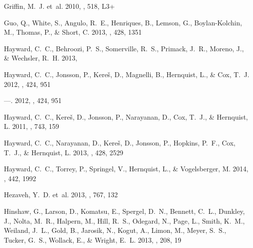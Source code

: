 \documentclass[iop]{emulateapj}
\begin{document}
\begin{thebibliography}{107}
{Griffin}, M.~J. {et~al.} 2010, \aap, 518, L3+

{Guo}, Q., {White}, S., {Angulo}, R.~E., {Henriques}, B., {Lemson}, G.,
  {Boylan-Kolchin}, M., {Thomas}, P., \& {Short}, C. 2013, \mnras, 428, 1351

{Hayward}, C.~C., {Behroozi}, P.~S., {Somerville}, R.~S., {Primack}, J.~R.,
  {Moreno}, J., \& {Wechsler}, R.~H. 2013{}, \mnras

{Hayward}, C.~C., {Jonsson}, P., {Kere{\v s}}, D., {Magnelli}, B., {Hernquist},
  L., \& {Cox}, T.~J. 2012{}, \mnras, 424, 951

---. 2012{}, \mnras, 424, 951

{Hayward}, C.~C., {Kere{\v s}}, D., {Jonsson}, P., {Narayanan}, D., {Cox},
  T.~J., \& {Hernquist}, L. 2011, \apj, 743, 159

{Hayward}, C.~C., {Narayanan}, D., {Kere{\v s}}, D., {Jonsson}, P., {Hopkins},
  P.~F., {Cox}, T.~J., \& {Hernquist}, L. 2013{}, \mnras, 428, 2529

{Hayward}, C.~C., {Torrey}, P., {Springel}, V., {Hernquist}, L., \&
  {Vogelsberger}, M. 2014, \mnras, 442, 1992

{Hezaveh}, Y.~D. {et~al.} 2013, \apj, 767, 132

{Hinshaw}, G., {Larson}, D., {Komatsu}, E., {Spergel}, D.~N., {Bennett}, C.~L.,
  {Dunkley}, J., {Nolta}, M.~R., {Halpern}, M., {Hill}, R.~S., {Odegard}, N.,
  {Page}, L., {Smith}, K.~M., {Weiland}, J.~L., {Gold}, B., {Jarosik}, N.,
  {Kogut}, A., {Limon}, M., {Meyer}, S.~S., {Tucker}, G.~S., {Wollack}, E., \&
  {Wright}, E.~L. 2013, \apjs, 208, 19


\end{thebibliography}
\end{document}
